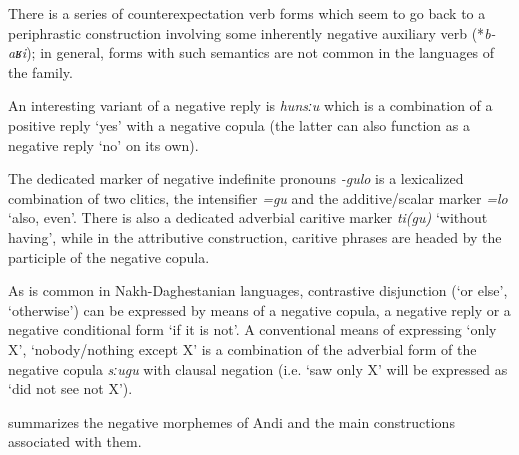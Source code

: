 \documentclass[output=paper,colorlinks=true, citecolor=brown]{langscibook}
\begin{document}
There is a series of counterexpectation verb forms which seem to go back to a periphrastic construction involving some inherently negative auxiliary verb (*\textit{b-aʁi}); in general, forms with such semantics are not common in the languages of the family.

An interesting variant of a negative reply is \textit{hunsːu} which is a combination of a positive reply ‘yes’ with a negative copula (the latter can also function as a negative reply ‘no’ on its own).

The dedicated marker of negative indefinite pronouns \textit{{}-gulo} is a lexicalized combination of two clitics, the intensifier \textit{=gu} and the additive/scalar marker \textit{=lo} ‘also, even’. There is also a dedicated adverbial caritive marker \textit{ti(gu)} ‘without having’, while in the attributive construction, caritive phrases are headed by the participle of the negative copula.

As is common in Nakh-Daghestanian languages, contrastive disjunction (‘or else’, ‘otherwise’) can be expressed by means of a negative copula, a negative reply or a negative conditional form ‘if it is not’. A conventional means of expressing ‘only X’, ‘nobody/nothing except X’ is a combination of the adverbial form of the negative copula \textit{sːugu} with clausal negation (i.e. ‘saw only X’ will be expressed as ‘did not see not X’).

 summarizes the negative morphemes of Andi and the main constructions associated with them. 
\end{document}
